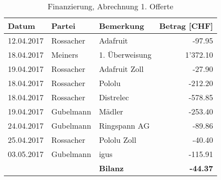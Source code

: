 \begin{table}[H]
	\small
	\centering
	\caption{Finanzierung, Abrechnung 1. Offerte}
	\begin{tabular}{lrlr}
		\hline
		\multicolumn{1}{|l|}{\textbf{Datum}} & \multicolumn{1}{l|}{\textbf{Partei}} & \multicolumn{1}{l|}{\textbf{Bemerkung}} & \multicolumn{1}{l|}{\textbf{Betrag [CHF]}} \\
		\hline
		\multicolumn{1}{|l|}{12.04.2017} & \multicolumn{1}{l|}{Rossacher} & \multicolumn{1}{l|}{Adafruit} & \multicolumn{1}{r|}{-97.95} \\
		\hline
		\multicolumn{1}{|l|}{18.04.2017} & \multicolumn{1}{l|}{Meiners} & \multicolumn{1}{l|}{1. Überweisung} & \multicolumn{1}{r|}{1'372.10} \\
		\hline
		\multicolumn{1}{|l|}{19.04.2017} & \multicolumn{1}{l|}{Rossacher} & \multicolumn{1}{l|}{Adafruit Zoll} & \multicolumn{1}{r|}{-27.90} \\
		\hline
		\multicolumn{1}{|l|}{18.04.2017} & \multicolumn{1}{l|}{Rossacher} & \multicolumn{1}{l|}{Pololu} & \multicolumn{1}{r|}{-212.20} \\
		\hline
		\multicolumn{1}{|l|}{18.04.2017} & \multicolumn{1}{l|}{Rossacher} & \multicolumn{1}{l|}{Distrelec} & \multicolumn{1}{r|}{-578.85} \\
		\hline
		\multicolumn{1}{|l|}{19.04.2017} & \multicolumn{1}{l|}{Gubelmann} & \multicolumn{1}{l|}{Mädler} & \multicolumn{1}{r|}{-253.40} \\
		\hline
		\multicolumn{1}{|l|}{24.04.2017} & \multicolumn{1}{l|}{Gubelmann} & \multicolumn{1}{l|}{Ringspann AG} & \multicolumn{1}{r|}{-89.86} \\
		\hline
		\multicolumn{1}{|l|}{25.04.2017} & \multicolumn{1}{l|}{Rossacher} & \multicolumn{1}{l|}{Pololu Zoll} & \multicolumn{1}{r|}{-40.40} \\
		\hline
		\multicolumn{1}{|l|}{03.05.2017} & \multicolumn{1}{l|}{Gubelmann} & \multicolumn{1}{l|}{igus} & \multicolumn{1}{r|}{-115.91} \\
		\hline
		&       & \textbf{Bilanz} & \textbf{-44.37} \\
	\end{tabular}%
	\label{tab:Finanzierung_Offerte1}%
\end{table}%


